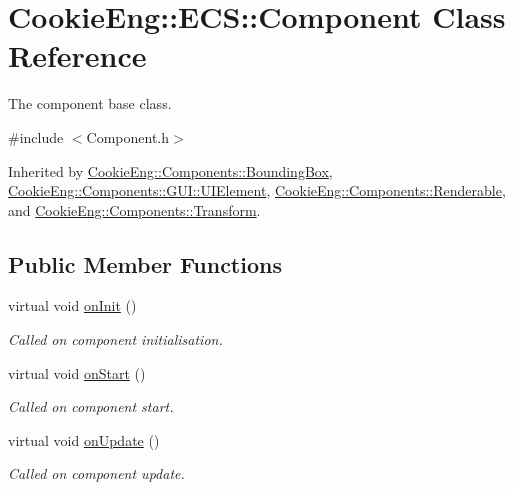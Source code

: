 \hypertarget{class_cookie_eng_1_1_e_c_s_1_1_component}{}\section{Cookie\+Eng\+:\+:E\+CS\+:\+:Component Class Reference}
\label{class_cookie_eng_1_1_e_c_s_1_1_component}


The component base class.  




{\ttfamily \#include $<$Component.\+h$>$}



Inherited by \hyperlink{class_cookie_eng_1_1_components_1_1_bounding_box}{Cookie\+Eng\+::\+Components\+::\+Bounding\+Box}, \hyperlink{class_cookie_eng_1_1_components_1_1_g_u_i_1_1_u_i_element}{Cookie\+Eng\+::\+Components\+::\+G\+U\+I\+::\+U\+I\+Element}, \hyperlink{class_cookie_eng_1_1_components_1_1_renderable}{Cookie\+Eng\+::\+Components\+::\+Renderable}, and \hyperlink{class_cookie_eng_1_1_components_1_1_transform}{Cookie\+Eng\+::\+Components\+::\+Transform}.

\subsection*{Public Member Functions}
\begin{DoxyCompactItemize}
\item 
virtual void \hyperlink{class_cookie_eng_1_1_e_c_s_1_1_component_a4b02b630558005a9c4723cf15b8b03d6}{on\+Init} ()
\begin{DoxyCompactList}\small\item\em Called on component initialisation. \end{DoxyCompactList}\item 
virtual void \hyperlink{class_cookie_eng_1_1_e_c_s_1_1_component_aaf8523586d57c3e40d4149f228755139}{on\+Start} ()
\begin{DoxyCompactList}\small\item\em Called on component start. \end{DoxyCompactList}\item 
virtual void \hyperlink{class_cookie_eng_1_1_e_c_s_1_1_component_a7c4a11f71e21181bc6f56841565b9a56}{on\+Update} ()
\begin{DoxyCompactList}\small\item\em Called on component update. \end{DoxyCompactList}\end{DoxyCompactItemize}
